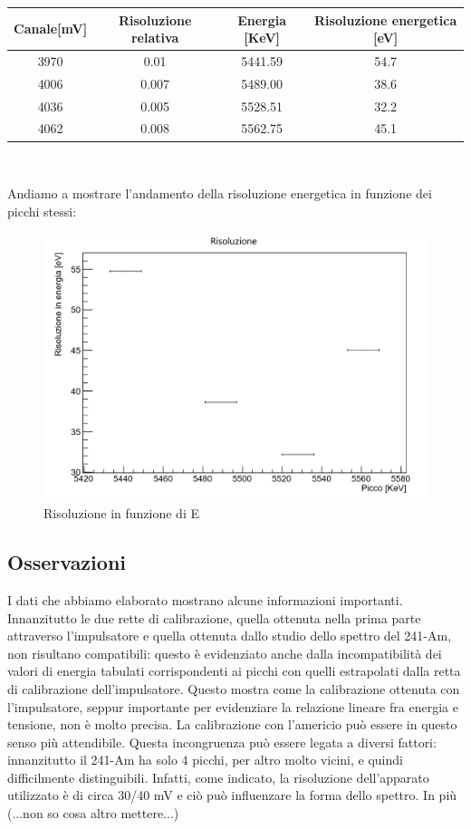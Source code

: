 \documentclass[a4paper,10pt]{article}
\begin{document}
\begin{center}
\begin{tabular}{cccc}
\toprule
Canale[mV] & Risoluzione relativa & Energia [KeV] & Risoluzione energetica [eV] \\
\midrule
3970 & 0.01 & 5441.59 & 54.7\\
4006 & 0.007 & 5489.00 & 38.6\\
4036 & 0.005 & 5528.51 & 32.2\\
4062 & 0.008 & 5562.75 & 45.1\\
\bottomrule
\end{tabular}\\
\end{center}

Andiamo a mostrare l'andamento della risoluzione energetica in funzione dei picchi stessi:

\begin{figure}[H]
\centering
\includegraphics[scale=0.5]{risoluzione.jpg}
\caption{Risoluzione in funzione di E}
\end{figure}

\subsection{Osservazioni}
I dati che abbiamo elaborato mostrano alcune informazioni importanti. Innanzitutto le due rette di calibrazione, quella ottenuta nella prima parte attraverso l'impulsatore e quella ottenuta dallo studio dello spettro del 241-Am, non risultano compatibili: questo è evidenziato anche dalla incompatibilit\`a dei valori di energia tabulati corrispondenti ai picchi con quelli estrapolati dalla retta di calibrazione dell'impulsatore. Questo mostra come la calibrazione ottenuta con l'impulsatore, seppur importante per evidenziare la relazione lineare fra energia e tensione, non \`e molto precisa. La calibrazione con l'americio pu\`o essere in questo senso pi\`u attendibile. Questa incongruenza pu\`o essere legata a diversi fattori: innanzitutto il 241-Am ha solo 4 picchi, per altro molto vicini, e quindi difficilmente distinguibili. Infatti, come indicato, la risoluzione dell'apparato utilizzato è di circa 30/40 mV e ci\`o pu\`o influenzare la forma dello spettro. In pi\`u (...non so cosa altro mettere...)\\
\end{document}
